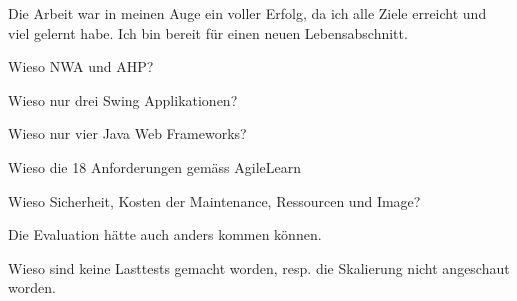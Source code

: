   Die Arbeit war in meinen Auge ein voller Erfolg, da ich alle Ziele erreicht
  und viel gelernt habe. Ich bin bereit für einen neuen Lebensabschnitt.

  Wieso NWA und AHP?

  Wieso nur drei Swing Applikationen?
  
  Wieso nur vier Java Web Frameworks?
  
  Wieso die 18 Anforderungen gemäss AgileLearn
  
  Wieso Sicherheit, Kosten der Maintenance, Ressourcen und Image?
  
  Die Evaluation hätte auch anders kommen können.
  
  Wieso sind keine Lasttests gemacht worden, resp. die Skalierung nicht
  angeschaut worden.
